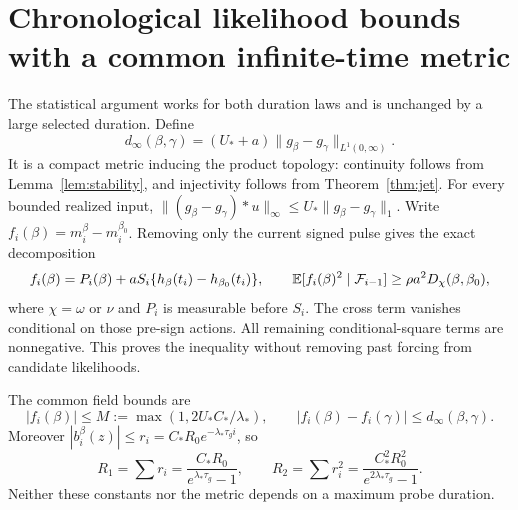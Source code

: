 \section{Chronological likelihood bounds with a common infinite-time metric}
\label{sec:statistics}
The statistical argument works for both duration laws and is unchanged by a
large selected duration. Define
\begin{equation}
 d_\infty(\beta,\gamma)=(U_*+a)\|g_\beta-g_\gamma\|_{L^1(0,\infty)}.
 \label{eq:common-metric}
\end{equation}
It is a compact metric inducing the product topology: continuity follows from
Lemma~\ref{lem:stability}, and injectivity follows from
Theorem~\ref{thm:jet}. For every bounded realized input,
$\|(g_\beta-g_\gamma)*u\|_\infty\le U_*\|g_\beta-g_\gamma\|_1$.
Write $f_i(\beta)=m_i^\beta-m_i^{\beta_0}$. Removing only the current signed
pulse gives the exact decomposition
\begin{equation}
 f_i(\beta)=P_i(\beta)+aS_i\{h_\beta(t_i)-h_{\beta_0}(t_i)\},\qquad
 \mathbb E[f_i(\beta)^2\mid\mathcal F_{i-1}]\ge\rho a^2D_\chi(\beta,\beta_0),
 \label{eq:sign-floor}
\end{equation}
where $\chi=\omega$ or $\nu$ and $P_i$ is measurable before $S_i$.
The cross term vanishes conditional on those pre-sign actions. All remaining
conditional-square terms are nonnegative. This proves the inequality without
removing past forcing from candidate likelihoods.

The common field bounds are
\[
 |f_i(\beta)|\le M:=\max(1,2U_*C_*/\lambda_*),\qquad
 |f_i(\beta)-f_i(\gamma)|\le d_\infty(\beta,\gamma).
\]
Moreover $|b_i^\beta(z)|\le r_i=C_*R_0e^{-\lambda_*\tau_gi}$, so
\begin{equation}
 R_1=\sum r_i=\frac{C_*R_0}{e^{\lambda_*\tau_g}-1},\qquad
 R_2=\sum r_i^2=\frac{C_*^2R_0^2}{e^{2\lambda_*\tau_g}-1}.
 \label{eq:transient-sums}
\end{equation}
Neither these constants nor the metric depends on a maximum probe duration.


